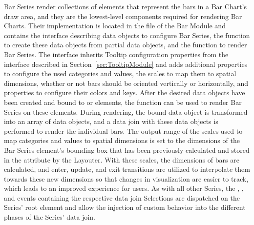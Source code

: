 Bar Series render collections of  elements that represent
the bars in a Bar Chart's draw area, and they are the lowest-level
components required for rendering Bar Charts.  Their implementation is
located in the  file of the Bar Module and
contains the  interface describing data objects to
configure Bar Series, the  function to create
these data objects from partial data objects, and the
 function to render Bar Series.  The
 interface inherits Tooltip configuration properties
from the  interface described in
Section~\ref{sec:TooltipModule} and adds additional properties to
configure the used categories and values, the scales to map them to
spatial dimensions, whether or not bars should be oriented vertically
or horizontally, and properties to configure their colors and keys.
After the desired  data objects have been created and
bound to  or  elements, the
 function can be used to render Bar Series on
these elements.  During rendering, the bound  data
object is transformed into an array of  data objects, and a
data join with these data objects is performed to render the
individual bars.  The output range of the scales used to map
categories and values to spatial dimensions is set to the dimensions
of the Bar Series element's bounding box that has been previously
calculated and stored in the  attribute by the Layouter.
With these scales, the dimensions of bars are calculated, and enter,
update, and exit transitions are utilized to interpolate them towards
these new dimensions so that changes in visualization are easier to
track, which leads to an improved experience for users.  As with all
other Series, the , , and  events
containing the respective data join Selections are dispatched on the
Series' root element and allow the injection of custom behavior into
the different phases of the Series' data join.

